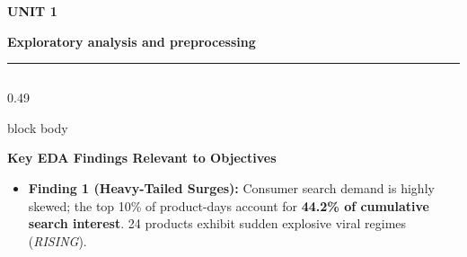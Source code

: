 \documentclass[aspectratio=169, 10pt]{beamer}
\newcommand{\slideheader}[3]{%
        \vspace{-0.25cm}%
        \noindent\begin{minipage}[t]{0.88\linewidth}%
            {\fontsize{7pt}{8.5pt}\selectfont \textbf{\color{BlueAccent}#1}}\par\vspace{1pt}%
            {\fontsize{11.5pt}{13.5pt}\selectfont \textbf{\color{NavyPrimary}#2}}%
        \end{minipage}%
        \hfill%
        \begin{minipage}[t]{0.10\linewidth}%
            \raggedleft{\fontsize{12pt}{14pt}\selectfont \textbf{\color{CoralAccent}#3}}%
        \end{minipage}\par%
        \vspace{2pt}%
        \textcolor{CardBorder}{\rule{\linewidth}{0.6pt}}\par%
        \vspace{3pt}%
    }
\newenvironment{card}[1][]{%
        \begin{beamercolorbox}[rounded=true,shadow=false,wd=\linewidth,sep=3.5pt,#1]{block body}%
        \fontsize{7.8pt}{9.8pt}\selectfont%
    }{%
        \end{beamercolorbox}%
    }
\begin{document}
    \begin{frame}[t]                                                                                                                                                                                   
        \slideheader{UNIT 1}{Exploratory analysis and preprocessing}{07}                                                                                                                               
        \begin{columns}[T]                                                                                                                                                                             
            \begin{column}{0.49\textwidth}                                                                                                                                                             
                \begin{card}                                                                                                                                                                           
                    {\fontsize{8pt}{9.5pt}\selectfont \textbf{\color{NavyPrimary}Key EDA Findings Relevant to Objectives}}\\[0.06cm]                                                                   
                    \begin{itemize}\setlength{\itemsep}{2pt}                                                                                                                                           
                        \item \textbf{Finding 1 (Heavy-Tailed Surges):} Consumer search demand is highly skewed; the top 10\% of product-days account for \textbf{44.2\% of cumulative search interest}.
  24 products exhibit sudden explosive viral regimes (\textit{RISING}).                                                                                                                                

\end{itemize}
\end{card}
\end{column}
\end{columns}
\end{frame}
\end{document}
